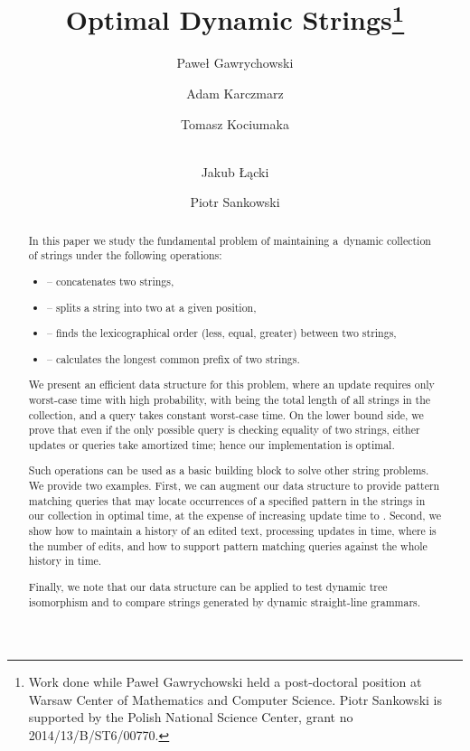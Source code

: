 \documentclass[a4paper]{article}
\theoremstyle{remark}
\begin{document}
\begin{titlepage}
\date{}
\title{Optimal Dynamic Strings\thanks{Work done while Paweł Gawrychowski held a post-doctoral position at  Warsaw  Center  of
Mathematics and Computer Science. Piotr Sankowski is supported by the Polish National Science Center, grant no 2014/13/B/ST6/00770.}}

\author[1]{Paweł Gawrychowski}
\author[1]{Adam Karczmarz}
\author[1]{Tomasz Kociumaka}
\author[2]{\\Jakub Łącki}
\author[1]{Piotr Sankowski}


\maketitle
\thispagestyle{empty}


\begin{abstract}
In this paper we study the fundamental problem of maintaining
a~dynamic collection of strings under the following operations:
\begin{itemize}
\item  -- concatenates two strings,
\item  -- splits a string into two at a given position,
\item  -- finds the lexicographical order (less, equal, greater) between two strings,
\item  -- calculates the longest common prefix of two strings.
\end{itemize}
We present an efficient data structure for this problem, where an update requires
only  worst-case time with high probability, with  being the total length of all strings
in the collection, and a query takes constant worst-case time.
On the lower bound side, we prove that even if the only possible query is checking equality of
two strings, either updates or queries take amortized  time; hence
our implementation is optimal.

Such operations can be used as a basic building block to solve other string problems.
We provide two examples. First, we can augment our data structure to provide
pattern matching queries that may locate occurrences of a specified pattern  in the
strings in our collection in optimal  time, at the expense of increasing update time to .
Second, we show how to maintain a history of an edited text, processing updates in  time,
where  is the number of edits, and how to support pattern matching queries against the whole
history in  time. 

Finally, we note that our data structure can be applied to test dynamic tree isomorphism
and to compare strings generated by dynamic straight-line grammars. 
\end{abstract}
\end{titlepage}
\newpage
\end{document}
